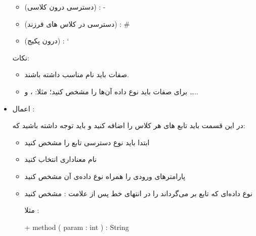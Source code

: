 \documentclass[]{article}
\begin{document}
\begin{itemize}[label=\textcolor{listColor}{$\blacklozenge$}]
\begin{itemize}[label={\textbullet}]
\item
{} (دسترسی درون کلاسی) :    -

\item
{} (دسترسی در کلاس های فرزند) :    \#

\item
{} (درون پکیج) :    \char`~



\end{itemize}

نکات:

\begin{itemize}[label={\textbullet}]

\item
صفات باید نام مناسب داشته باشند.

\item
برای صفات باید نوع داده آن‌ها را مشخص کنید؛ مثلا:  ، و …..


\end{itemize}
   
   \item
   {\fehrest \textcolor{listColor}{اعمال :}}
   
   
   در این قسمت باید تابع های هر کلاس  را اضافه کنید و باید توجه داشته باشید که:
   
\begin{itemize}[label={\textbullet}]

\item
ابتدا باید نوع دسترسی تابع را مشخص کنید

\item
نام معناداری انتخاب کنید

\item
پارامتر‌های ورودی را همراه نوع داده‌ی آن مشخص کنید

\item
نوع داده‌ای که تابع بر می‌گرداند  را  در انتهای خط پس از \linebreak علامت : مشخص کنید

مثلا :

\begin{center}
\begin{latin}
+ method ( param : int ) : String

\end{latin}
\end{center}



\end{itemize}   


\begin{center}



\end{center}
\end{itemize}
\end{document}
